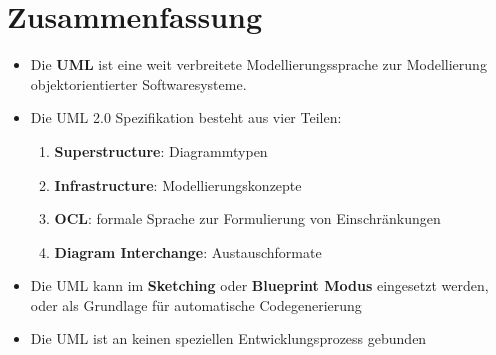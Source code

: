 \section{Zusammenfassung}

\begin{itemize}
    \item Die \textbf{UML} ist eine weit verbreitete Modellierungssprache zur Modellierung objektorientierter Softwaresysteme.
    \item Die UML 2.0 Spezifikation besteht aus vier Teilen:
    \begin{enumerate}
        \item \textbf{Superstructure}: Diagrammtypen
        \item \textbf{Infrastructure}: Modellierungskonzepte
        \item \textbf{OCL}: formale Sprache zur Formulierung von Einschränkungen
        \item \textbf{Diagram Interchange}: Austauschformate
    \end{enumerate}
    \item Die UML kann im \textbf{Sketching} oder \textbf{Blueprint Modus} eingesetzt werden, oder als Grundlage für automatische Codegenerierung
    \item Die UML ist an keinen speziellen Entwicklungsprozess gebunden
\end{itemize}